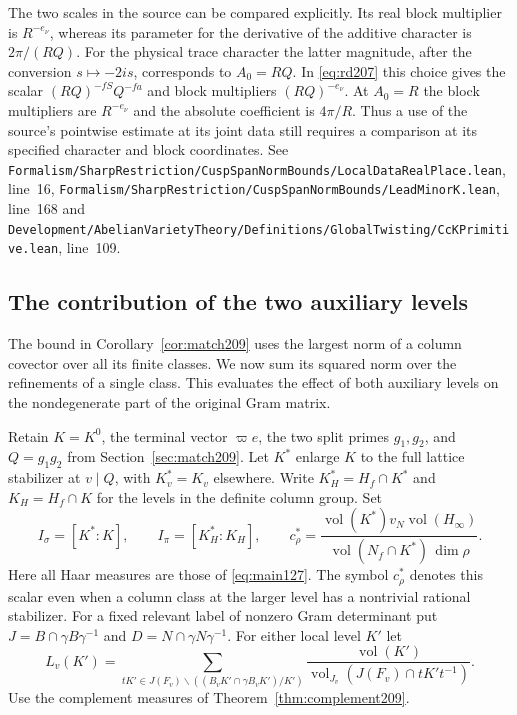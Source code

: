 \documentclass[a4paper,11pt]{article}
\theoremstyle{definition}
\theoremstyle{remark}
\newcommand{\srcloc}[2]{{\small\nolinkurl{#1.lean}}, line~#2}
\numberwithin{equation}{section}
\begin{document}
The two scales in the source can be compared explicitly.
Its real block multiplier is \(R^{-e_\nu}\), whereas its parameter
for the derivative of the additive character is \(2\pi/(RQ)\).
For the physical trace character the latter magnitude, after the
conversion \(s\mapsto-2is\), corresponds to \(A_0=RQ\).
In \eqref{eq:rd207} this choice gives the scalar
\((RQ)^{-fS}Q^{-fa}\) and block multipliers \((RQ)^{-e_\nu}\).
At \(A_0=R\) the block multipliers are \(R^{-e_\nu}\) and the
absolute coefficient is \(4\pi/R\). Thus a use of the source's
pointwise estimate at its joint data still requires a comparison
at its specified character and block coordinates.
See \srcloc{Formalism/SharpRestriction/CuspSpanNormBounds/LocalDataRealPlace}{16},
\srcloc{Formalism/SharpRestriction/CuspSpanNormBounds/LeadMinorK}{168}
and \srcloc{Development/AbelianVarietyTheory/Definitions/GlobalTwisting/CcKPrimitive}{109}.

\subsection{The contribution of the two auxiliary levels}\label{nav:IX-05}
\label{sec:refine211}

The bound in Corollary~\ref{cor:match209} uses the largest norm of a
column covector over all its finite classes. We now sum its squared
norm over the refinements of a single class. This evaluates the
effect of both auxiliary levels on the nondegenerate part of the
original Gram matrix.

Retain \(K=K^0\), the terminal vector \(\varpi e\), the two split
primes \(g_1,g_2\), and \(Q=g_1g_2\) from
Section~\ref{sec:match209}. Let \(K^*\) enlarge \(K\) to the full
lattice stabilizer at \(v\mid Q\), with \(K^*_v=K_v\) elsewhere.
Write \(K_H^*=H_f\cap K^*\) and \(K_H=H_f\cap K\) for the
levels in the definite column group. Set
\[
 I_\sigma=[K^*:K],\qquad I_\pi=[K_H^*:K_H],\qquad
 c_\rho^*=
 \frac{\operatorname{vol}(K^*)v_N\operatorname{vol}(H_\infty)}
      {\operatorname{vol}(N_f\cap K^*)\,\dim\rho}.
\]
Here all Haar measures are those of \eqref{eq:main127}. The symbol
\(c_\rho^*\) denotes this scalar even when a column class at the
larger level has a nontrivial rational stabilizer. For a fixed
relevant label of nonzero Gram determinant put
\(J=B\cap\gamma B\gamma^{-1}\) and \(D=N\cap\gamma N\gamma^{-1}\).
For either local level \(K'\) let
\[
 L_v(K')=\sum_{tK'\in J(F_v)\backslash
            ((B_vK'\cap\gamma B_vK')/K')}
      \frac{\operatorname{vol}(K')}
           {\operatorname{vol}_{J_v}(J(F_v)\cap tK't^{-1})}.
\]
Use the complement measures of Theorem~\ref{thm:complement209}.
\end{document}
